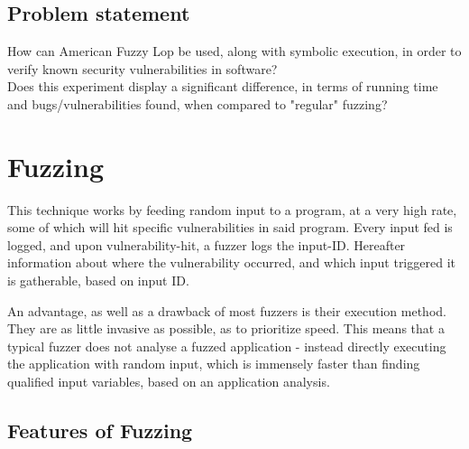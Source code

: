 \documentclass[a4paper]{article}
\begin{document}
\subsection{Problem statement}
How can American Fuzzy Lop be used, along with symbolic execution, in order to verify known security vulnerabilities in software?\\
Does this experiment display a significant difference, in terms of running time and bugs/vulnerabilities found, when compared to "regular" fuzzing?
\newpage
\section{Fuzzing}
This technique works by feeding random input to a program, at a very high rate, some of which will hit specific vulnerabilities in said program. Every input fed is logged, and upon vulnerability-hit, a fuzzer logs the input-ID. Hereafter information about where the vulnerability occurred, and which input triggered it is gatherable, based on input ID.

An advantage, as well as a drawback of most fuzzers is their execution method. They are as little invasive as possible, as to prioritize speed. This means that a typical fuzzer does not analyse a fuzzed application - instead directly executing the application with random input, which is immensely faster than finding qualified input variables, based on an application analysis.
\subsection{Features of Fuzzing}
\end{document}
